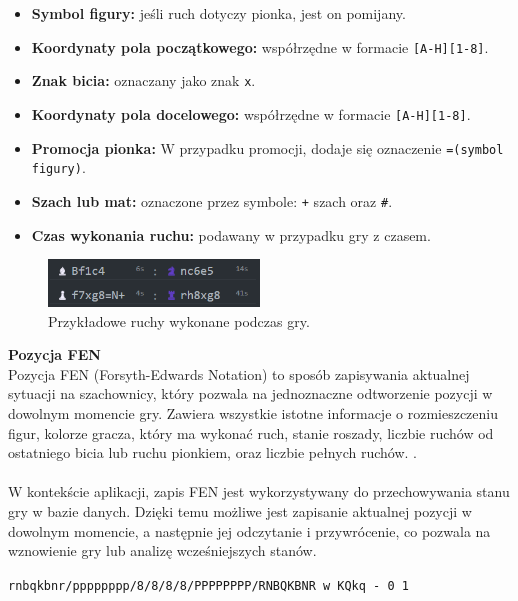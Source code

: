 \documentclass[twoside]{projektInzynierskiMS1}
\begin{document}
\begin{itemize}
    \item \textbf{Symbol figury:} jeśli ruch dotyczy pionka, jest on pomijany.
    \item \textbf{Koordynaty pola początkowego:} współrzędne w formacie \texttt{[A-H][1-8]}.
    \item \textbf{Znak bicia:} oznaczany jako znak \texttt{x}.
    \item \textbf{Koordynaty pola docelowego:} współrzędne w formacie \texttt{[A-H][1-8]}.
    \item \textbf{Promocja pionka:} W przypadku promocji, dodaje się oznaczenie \texttt{=(symbol figury)}.
    \item \textbf{Szach lub mat:} oznaczone przez symbole: \texttt{+} szach oraz \texttt{\#}.
    \item \textbf{Czas wykonania ruchu:} podawany w przypadku gry z czasem.
\end{itemize}

\vspace{0.5cm}
\begin{figure}[h!]
    \centering
    \includegraphics[width=0.5\textwidth]{images/imp_moves.png}
    \caption{Przykładowe ruchy wykonane podczas gry.}
\end{figure}
\vspace{0.5cm}

\noindent \textbf{Pozycja FEN}\\
Pozycja FEN (Forsyth-Edwards Notation) to sposób zapisywania aktualnej sytuacji na szachownicy, który pozwala na jednoznaczne odtworzenie pozycji w dowolnym momencie gry. Zawiera wszystkie istotne informacje o rozmieszczeniu figur, kolorze gracza, który ma wykonać ruch, stanie roszady, liczbie ruchów od ostatniego bicia lub ruchu pionkiem, oraz liczbie pełnych ruchów.  \cite{WikiNotacjaForsytha}.
\\\\
W kontekście aplikacji, zapis FEN jest wykorzystywany do przechowywania stanu gry w bazie danych. Dzięki temu możliwe jest zapisanie aktualnej pozycji w dowolnym momencie, a następnie jej odczytanie i przywrócenie, co pozwala na wznowienie gry lub analizę wcześniejszych stanów.

\begin{center}
    \texttt{rnbqkbnr/pppppppp/8/8/8/8/PPPPPPPP/RNBQKBNR w KQkq - 0 1}
\end{center}
\end{document}
